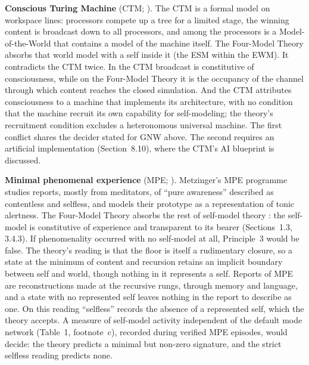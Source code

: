 \documentclass[12pt]{article}
\begin{document}
\textbf{Conscious Turing Machine} (CTM; \citealp{Blum2022}). The CTM is a formal model on workspace lines: processors compete up a tree for a limited stage, the winning content is broadcast down to all processors, and among the processors is a Model-of-the-World that contains a model of the machine itself. The Four-Model Theory absorbs that world model with a self inside it (the ESM within the EWM). It contradicts the CTM twice. In the CTM broadcast is constitutive of consciousness, while on the Four-Model Theory it is the occupancy of the channel through which content reaches the closed simulation. And the CTM attributes consciousness to a machine that implements its architecture, with no condition that the machine recruit its own capability for self-modeling; the theory's recruitment condition excludes a heteronomous universal machine. The first conflict shares the decider stated for GNW above. The second requires an artificial implementation (Section~8.10), where the CTM's AI blueprint \citep{Yu2026} is discussed.

\textbf{Minimal phenomenal experience} (MPE; \citealp{Metzinger2020}). Metzinger's MPE programme studies reports, mostly from meditators, of ``pure awareness'' described as contentless and selfless, and models their prototype as a representation of tonic alertness. The Four-Model Theory absorbs the rest of self-model theory \citep{Metzinger2003}: the self-model is constitutive of experience and transparent to its bearer (Sections~1.3, 3.4.3). If phenomenality occurred with no self-model at all, Principle~3 would be false. The theory's reading is that the floor is itself a rudimentary closure, so a state at the minimum of content and recursion retains an implicit boundary between self and world, though nothing in it represents a self. Reports of MPE are reconstructions made at the recursive rungs, through memory and language, and a state with no represented self leaves nothing in the report to describe as one. On this reading ``selfless'' records the absence of a represented self, which the theory accepts. A measure of self-model activity independent of the default mode network (Table~1, footnote~c), recorded during verified MPE episodes, would decide: the theory predicts a minimal but non-zero signature, and the strict selfless reading predicts none.
\end{document}
